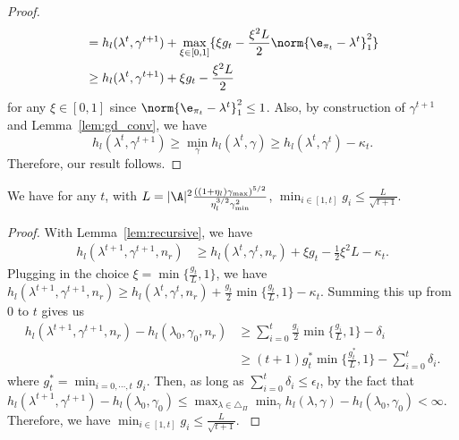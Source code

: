 \documentclass{article}
\newcommand{\lalit}[1]{\textcolor{blue}{}}
\newcommand{\1}{\mathbf{1}}
\begin{document}
\begin{proof}
\begin{align*}
    &= h_l(\lambda^{t},\gamma^{t+1}) +\max_{\xi\in[0,1]} \{\xi g_t-\frac{\xi^2 L}{2}\norm{\e_{\pi_t}-\lambda^{t}}_1^2\}\\
    &\geq h_l(\lambda^{t},\gamma^{t+1}) +\xi g_t-\frac{\xi^2 L}{2}
\end{align*}
for any $\xi\in[0,1]$ since $\norm{\e_{\pi_t}-\lambda^{t}}_1^2\leq 1$. Also, by construction of $\gamma^{t+1}$ and Lemma~\ref{lem:gd_conv}, we have 
\begin{equation*}
    h_l(\lambda^{t},\gamma^{t+1})\geq\min_{\gamma}h_l(\lambda^{t},\gamma)\geq h_l(\lambda^{t},\gamma^{t})-\kappa_t.
\end{equation*}
Therefore, our result follows. 
\end{proof}
\begin{lemma}\label{lem:saddle_point}
We have for any $t$, with $L=|\A|^2\frac{((1+\eta_l)\gamma_{\max})^{5/2}}{\eta_l^{3/2}\gamma_{\min}^2}$, $\min_{i\in[1,t]} g_i\leq \frac{L}{\sqrt{t+1}}$. 
\end{lemma}
\begin{proof}
With Lemma~\ref{lem:recursive}, we have
\begin{align*}
    h_l(\lambda^{t+1},\gamma^{t+1},n_{r})&\geq h_l(\lambda^{t},\gamma^{t},n_r)+\xi g_t-\frac{1}{2}\xi^2L-\kappa_t.
\end{align*}
Plugging in the choice $\xi=\min\{\frac{g_t}{L},1\}$, we have $h_l(\lambda^{t+1},\gamma^{t+1},n_{r})\geq h_l(\lambda^{t},\gamma^{t},n_r)+\frac{g_t}{2}\min\{\frac{g_t}{L},1\}-\kappa_t$. Summing this up from 0 to $t$ gives us 
\begin{align*}
    h_l(\lambda^{t+1},\gamma^{t+1},n_{r})-h_l(\lambda_0,\gamma_0,n_r)&\geq\sum_{i=0}^{t}\frac{g_i}{2}\min\{\frac{g_i}{L},1\}-\delta_i\\
    &\geq (t+1)g_t^*\min\{\frac{g_t^*}{L},1\}-\sum_{i=0}^t\delta_i. 
\end{align*}
where $g_t^*=\min_{i=0,\cdots,t}g_i$. Then, as long as $\sum_{i=0}^t\delta_i\leq \epsilon_l$, by the fact that $h_l(\lambda^{t+1},\gamma^{t+1})-h_l(\lambda_0,\gamma_0)\leq \max_{\lambda\in\triangle_\Pi}\min_{\gamma}h_l(\lambda,\gamma)-h_l(\lambda_0,\gamma_0)<\infty$. Therefore, we have $\min_{i\in[1,t]} g_i\leq \frac{L}{\sqrt{t+1}}$. 
\lalit{Note that 
$$\frac{\gamma_{\max}}{\gamma_{\min}}=(1+\eta_l)^{1/3}(2+\eta_l)^{2/3}\frac{1}{|\A|\eta_l}\leq 2|\A|^3\epsilon_l^{-2}.$$
Therefore, Plugging in $L$ gives us
\begin{align*}
    \min_{i\in[1,t]} g_i &\leq |\A|^2\frac{((1+\eta_l)\gamma_{\max})^{5/2}}{\eta_l^{3/2}\gamma_{\min}^2} \frac{1}{\sqrt{t+1}}\leq |\A|^2\frac{(1+\eta_l)^{5/2}}{\eta_l^{3/2}}4|\A|^6\epsilon_l^{-4}\sqrt{\gamma_{\max}}\frac{1}{\sqrt{t+1}}\\
    &\leq 4|\A|^8\epsilon_l^{-4}\frac{1}{\sqrt{t+1}}.
\end{align*}
}
\end{proof}
\end{document}
